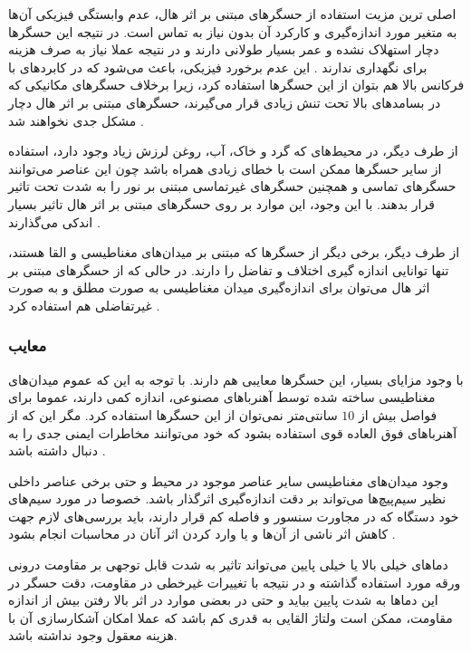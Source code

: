 اصلی ترین مزیت استفاده از حسگر‌های مبتنی بر اثر هال، عدم وابستگی فیزیکی آن‌ها به متغیر مورد اندازه‌گیری و کارکرد آن بدون نیاز به تماس است. در نتیجه این حسگرها دچار استهلاک نشده و عمر بسیار طولانی دارند و در نتیجه عملا نیاز به صرف هزینه برای نگهداری ندارند \cite{ratna}. این عدم برخورد فیزیکی، باعث می‌شود که در کابردهای با فرکانس بالا هم بتوان از این حسگر‌ها استفاده کرد، زیرا برخلاف حسگر‌های مکانیکی که در بسامدهای بالا تحت تنش زیادی قرار می‌گیرند، حسگر‌های مبتنی بر اثر هال دچار مشکل جدی نخواهند شد \cite{wiki_sensor}.


از طرف دیگر، در محیط‌های که گرد و خاک، آب، روغن لرزش زیاد وجود دارد، استفاده از سایر حسگر‌ها ممکن است با خطای زیادی همراه باشد چون این عناصر می‌توانند حسگر‌های تماسی و همچنین حسگر‌های غیرتماسی مبتنی بر نور را به شدت تحت تاثیر قرار بدهند. با این وجود،‌ این موارد بر روی حسگر‌های مبتنی بر اثر هال تاثیر بسیار اندکی می‌گذارند \cite{wiki_sensor}.


از طرف دیگر،  برخی دیگر از حسگرها که مبتنی بر میدان‌های مغناطیسی و القا هستند،‌ تنها توانایی اندازه گیری اختلاف و تفاضل را دارند. در حالی که از حسگر‌های مبتنی بر اثر هال می‌توان برای اندازه‌گیری میدان مغناطیسی به صورت مطلق و به صورت غیرتفاضلی هم استفاده کرد  \cite{wiki_sensor}.


\subsubsection{معایب}

با وجود مزایای بسیار،‌ این حسگرها معایبی هم دارند. با توجه به این که عموم میدان‌های مغناطیسی ساخته شده توسط آهنرباهای مصنوعی،‌ اندازه کمی دارند، عموما برای فواصل بیش از $10$ سانتی‌متر نمی‌توان از این حسگرها استفاده کرد. مگر این که از آهنرباهای فوق العاده قوی استفاده بشود که خود می‌توانند مخاطرات ایمنی جدی را به دنبال داشته باشد \cite{ratna}.


وجود میدان‌های مغناطیسی سایر عناصر موجود در محیط و حتی برخی عناصر داخلی نظیر سیم‌پیچ‌ها می‌تواند بر دقت اندازه‌گیری اثرگذار باشد. خصوصا در مورد سیم‌های خود دستگاه که در مجاورت سنسور و فاصله کم قرار دارند، باید بررسی‌های لازم جهت کاهش اثر ناشی از آن‌ها و یا وارد کردن اثر آنان در محاسبات انجام بشود \cite{ratna}.


دماهای خیلی بالا یا خیلی پایین می‌تواند تاثیر به شدت قابل توجهی بر مقاومت درونی ورقه مورد استفاده گذاشته \cite{ratna} و در نتیجه با تغییرات غیرخطی در مقاومت، دقت حسگر در این دماها به شدت پایین بیاید و حتی در بعضی موارد در اثر بالا رفتن بیش از اندازه مقاومت،‌ ممکن است ولتاژ القایی به قدری کم باشد که عملا امکان آشکارسازی آن با هزینه معقول وجود نداشته باشد.


